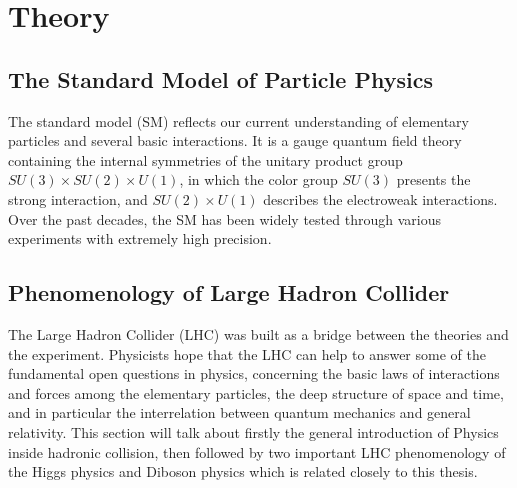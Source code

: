 
\chapter{Theory}

\section{The Standard Model of Particle Physics}
The standard model (SM) reflects our current understanding of elementary particles and several basic interactions.
It is a gauge quantum field theory containing the internal symmetries of the unitary product group $SU(3) × SU(2) × U(1)$, 
in which the color group $SU(3)$ presents the strong interaction, and $SU(2) × U(1)$ describes the electroweak interactions.
Over the past decades, the SM has been widely tested through various experiments with extremely high precision.





\section{Phenomenology of Large Hadron Collider}
The Large Hadron Collider (LHC) was built as a bridge between the theories and the experiment.
Physicists hope that the LHC can help to answer some of the fundamental open questions in physics, 
concerning the basic laws of interactions and forces among the elementary particles, 
the deep structure of space and time, and in particular the interrelation between quantum mechanics and general relativity.
This section will talk about firstly the general introduction of Physics inside hadronic collision,
then followed by two important LHC phenomenology of the Higgs physics and Diboson physics which is related closely to this thesis.




